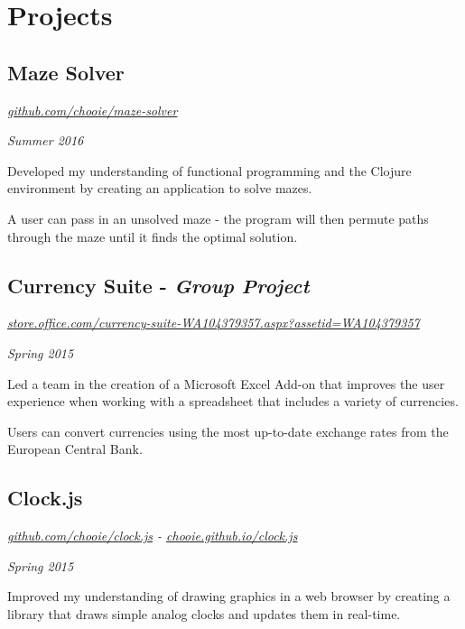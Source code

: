 \section*{Projects}

\subsection*{Maze Solver}
\noindent\begin{minipage}[b]{0.8\textwidth}
  \flushleft
  \emph{\href{https://github.com/chooie/maze-solver} {github.com/chooie/maze-solver}}
\end{minipage}
\noindent\begin{minipage}[b]{0.2\textwidth}
  \flushright
  \emph{Summer 2016}
\end{minipage}

Developed my understanding of functional programming and the Clojure environment by creating an application to solve mazes.

A user can pass in an unsolved maze - the program will then permute paths through the maze until it finds the optimal solution.

\subsection*{Currency Suite - \textit{Group Project}}
\noindent\begin{minipage}[b]{0.8\textwidth}
  \flushleft
  \emph{\href{https://store.office.com/currency-suite-WA104379357.aspx?assetid=WA104379357} {store.office.com/currency-suite-WA104379357.aspx?assetid=WA104379357}}
\end{minipage}
\noindent\begin{minipage}[b]{0.2\textwidth}
  \flushright
  \emph{Spring 2015}
\end{minipage}

Led a team in the creation of a Microsoft Excel Add-on that improves the user experience when working with a spreadsheet that includes a variety of currencies.

Users can convert currencies using the most up-to-date exchange rates from the European Central Bank.

\subsection*{Clock.js}
\noindent\begin{minipage}[b]{0.5\textwidth}
  \flushleft
  \emph{\href{https://github.com/chooie/clock.js} {github.com/chooie/clock.js} - \href {https://chooie.github.io/clock.js} {chooie.github.io/clock.js}}
\end{minipage}
\noindent\begin{minipage}[b]{0.5\textwidth}
  \flushright
  \emph{Spring 2015}
\end{minipage}

Improved my understanding of drawing graphics in a web browser by creating a library that draws simple analog clocks and updates them in real-time.


